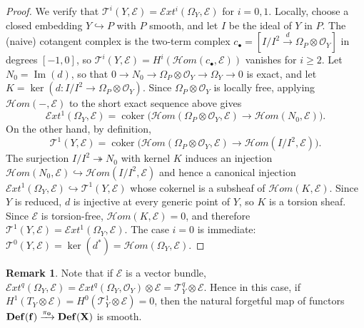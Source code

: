 \documentclass[12pt,twoside,]{amsart}
\theoremstyle{plain}
\theoremstyle{definition}
\newtheorem{remark}[theorem]{Remark}
\begin{document}
\begin{proof}

We verify that $\mathcal{T}^i(Y,\mathcal{E}) = \mathcal{E}xt^i(\Omega_Y,\mathcal{E})$ for $i=0,1$.
Locally, choose a closed embedding $Y \hookrightarrow P$ with $P$ smooth, and let
$I$ be the ideal of $Y$ in $P$. The (naive) cotangent complex is the two-term
complex $c_\bullet = [I/I^2 \xrightarrow{d} \Omega_P \otimes \mathcal{O}_Y]$ in degrees $[-1,0]$,
so $\mathcal{T}^i(Y,\mathcal{E}) = H^i(\mathcal{H}om(c_\bullet, \mathcal{E}))$ vanishes for $i \geq 2$.
Let $N_0 = \operatorname{Im}(d)$, so that
$0 \to N_0 \to \Omega_P \otimes \mathcal{O}_Y \to \Omega_Y \to 0$
is exact, and let $K = \ker(d: I/I^2 \to \Omega_P \otimes \mathcal{O}_Y)$.
Since $\Omega_P \otimes \mathcal{O}_Y$ is locally free, applying $\mathcal{H}om(-,\mathcal{E})$
to the short exact sequence above gives
\[
\mathcal{E}xt^1(\Omega_Y, \mathcal{E})
= \operatorname{coker}\bigl(\mathcal{H}om(\Omega_P \otimes \mathcal{O}_Y, \mathcal{E})
\to \mathcal{H}om(N_0, \mathcal{E})\bigr).
\]
On the other hand, by definition,
\[
\mathcal{T}^1(Y,\mathcal{E})
= \operatorname{coker}\bigl(\mathcal{H}om(\Omega_P \otimes \mathcal{O}_Y, \mathcal{E})
\to \mathcal{H}om(I/I^2, \mathcal{E})\bigr).
\]
The surjection $I/I^2 \twoheadrightarrow N_0$ with kernel $K$ induces an injection
$\mathcal{H}om(N_0, \mathcal{E}) \hookrightarrow \mathcal{H}om(I/I^2, \mathcal{E})$
and hence a canonical injection
$\mathcal{E}xt^1(\Omega_Y, \mathcal{E}) \hookrightarrow \mathcal{T}^1(Y, \mathcal{E})$
whose cokernel is a subsheaf of $\mathcal{H}om(K, \mathcal{E})$.
Since $Y$ is reduced, $d$ is injective at every generic point of $Y$,
so $K$ is a torsion sheaf. Since $\mathcal{E}$ is torsion-free,
$\mathcal{H}om(K, \mathcal{E}) = 0$, and therefore
$\mathcal{T}^1(Y, \mathcal{E}) = \mathcal{E}xt^1(\Omega_Y, \mathcal{E})$.
The case $i=0$ is immediate:
$\mathcal{T}^0(Y,\mathcal{E}) = \ker(d^*) = \mathcal{H}om(\Omega_Y, \mathcal{E})$.

\end{proof}

\begin{remark}\label{when E is a vector bundle}
    Note that if $\mathcal{E}$ is a vector bundle, $\mathcal{E}xt^q(\Omega_Y, \mathcal{E}) = \mathcal{E}xt^q(\Omega_Y, \mathcal{O}_Y) \otimes \mathcal{E} = \mathcal{T}_Y^q \otimes \mathcal{E}$. Hence in this case, if $H^1(T_Y \otimes \mathcal{E}) = H^0(\mathcal{T}_Y^1 \otimes \mathcal{E}) = 0$, then the natural forgetful map of functors $\bf Def(f) \xrightarrow{\pi_0} \bf Def(X)$ is smooth. 
\end{remark}
\end{document}
